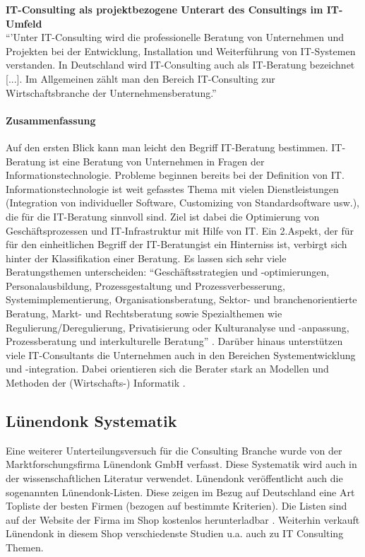 		\textbf{ IT-Consulting als  projektbezogene Unterart des Consultings im IT-Umfeld}\\
			``'Unter IT-Consulting wird die professionelle Beratung von Unternehmen und Projekten bei der Entwicklung, Installation und Weiterführung von IT-Systemen verstanden. In Deutschland wird IT-Consulting auch als IT-Beratung bezeichnet [...]. Im Allgemeinen zählt man den Bereich IT-Consulting zur Wirtschaftsbranche der Unternehmensberatung.''
			\cite{statistaITCons}
		\paragraph*{Zusammenfassung} 
					Auf den ersten Blick kann man leicht den Begriff IT-Beratung bestimmen. IT-Beratung ist eine Beratung von Unternehmen in Fragen der Informationstechnologie. Probleme beginnen bereits bei der Definition von IT. Informationstechnologie ist weit gefasstes Thema mit vielen Dienstleistungen (Integration von individueller Software, Customizing von Standardsoftware usw.), die für die IT-Beratung sinnvoll sind. Ziel ist dabei die Optimierung von Geschäftsprozessen und IT-Infrastruktur mit Hilfe von IT.
			Ein 2.Aspekt, der für für den einheitlichen Begriff der IT-Beratungist ein Hinterniss ist, verbirgt sich hinter der Klassifikation einer Beratung. Es lassen sich sehr viele Beratungsthemen unterscheiden: %
			 ``Geschäftsstrategien und -optimierungen, Personalausbildung, Prozessgestaltung und Prozessverbesserung, Systemimplementierung, Organisationsberatung, Sektor- und branchenorientierte Beratung, Markt- und Rechtsberatung sowie Spezialthemen wie
			Regulierung/Deregulierung,  Privatisierung oder Kulturanalyse und -anpassung, Prozessberatung und  interkulturelle Beratung'' \cite[37]{ReinekeBock200709}.
			Darüber hinaus unterstützen viele IT-Consultants die Unternehmen auch in den Bereichen Systementwicklung und -integration. Dabei orientieren sich die Berater stark an Modellen und Methoden der (Wirtschafts-) Informatik \cite{InfTag2011}.
			

\subsection{Lünendonk Systematik}
Eine weiterer Unterteilungsversuch für die Consulting Branche wurde von der Marktforschungsfirma Lünendonk GmbH verfasst.
Diese Systematik wird auch in der wissenschaftlichen Literatur \cite[56]{Lippold201309} verwendet. Lünendonk veröffentlicht
auch die sogenannten Lünendonk-Listen. Diese zeigen im Bezug auf Deutschland eine Art Topliste der besten Firmen (bezogen auf bestimmte Kriterien).
Die Listen sind auf der Website der Firma im Shop kostenlos herunterladbar \cite {topBITP} . Weiterhin verkauft Lünendonk in diesem Shop verschiedenste Studien u.a.
auch zu IT Consulting Themen.

